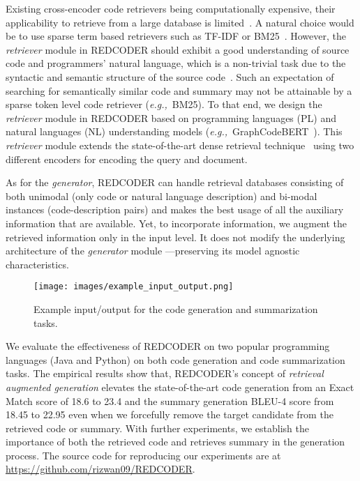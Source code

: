 \documentclass[11pt]{article}
\newcommand{\tool}{{REDCODER}\xspace}
\newcommand{\eg}{\textit{e.g.,}~}
\begin{document}
Existing cross-encoder code retrievers being computationally expensive, their applicability to retrieve from a large database is limited~\cite{Humeau2020Poly-encoders:}. A natural choice would be to use sparse term based retrievers such as TF-IDF or BM25~\cite{robertson2009probabilistic}.  However, the \emph{retriever} module in \tool should exhibit a good understanding of source code and programmers' natural language, which is a non-trivial task due to the syntactic and semantic structure of the source code~\cite{guo2020graphcodebert, ahmad2021unified}. Such an expectation of searching for semantically similar code and summary may not be attainable by a sparse token level code retriever (\eg BM25). To that end, we design the {\em retriever} module in \tool based on programming languages (PL)  and natural languages (NL) understanding models (\eg GraphCodeBERT~\cite{guo2020graphcodebert}). This {\em retriever} module extends the state-of-the-art dense retrieval technique~\cite{karpukhin-etal-2020-dense} using two different encoders for encoding the query and document. 


As for the {\em generator}, \tool can handle retrieval databases consisting of both unimodal  (only code or natural language description) and bi-modal instances (code-description pairs) and makes the best usage of all the auxiliary information that are available. Yet, to incorporate information, we augment the retrieved  information only in the input level. It  does not modify the underlying architecture of the \emph{generator} module ---preserving its model agnostic characteristics.  


\begin{figure}
\captionsetup[subfigure]{labelformat=empty}
\vspace{-5mm}
\centering
\texttt{[image: images/example\_input\_output.png]}
\caption{Example input/output for the code generation and summarization tasks.}
\vspace{-3mm}
\label{figure:tasks}
\end{figure}


We evaluate the effectiveness of \tool on two popular programming languages (Java and Python) on both code generation and code summarization tasks. The empirical results show that, \tool's concept of {\em retrieval augmented generation} elevates the state-of-the-art code generation from an Exact Match score of 18.6 to 23.4 and the summary generation BLEU-4 score from 18.45 to 22.95 even when we forcefully remove the target candidate from the retrieved code or summary. With further experiments, we establish the importance of both the retrieved code and retrieves summary in the generation process.
The source code for reproducing our experiments are at \url{https://github.com/rizwan09/REDCODER}.
\end{document}
